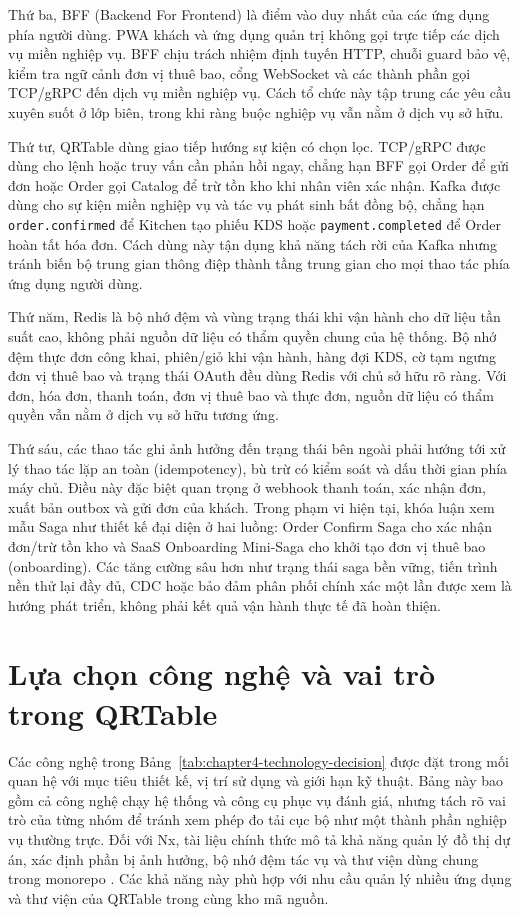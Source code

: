 Thứ ba, BFF (Backend For Frontend) là điểm vào duy nhất của các ứng dụng phía người dùng. PWA khách và ứng dụng quản trị không gọi trực tiếp các dịch vụ miền nghiệp vụ. BFF chịu trách nhiệm định tuyến HTTP, chuỗi guard bảo vệ, kiểm tra ngữ cảnh đơn vị thuê bao, cổng WebSocket và các thành phần gọi TCP/gRPC đến dịch vụ miền nghiệp vụ. Cách tổ chức này tập trung các yêu cầu xuyên suốt ở lớp biên, trong khi ràng buộc nghiệp vụ vẫn nằm ở dịch vụ sở hữu.

Thứ tư, QRTable dùng giao tiếp hướng sự kiện có chọn lọc. TCP/gRPC được dùng cho lệnh hoặc truy vấn cần phản hồi ngay, chẳng hạn BFF gọi Order để gửi đơn hoặc Order gọi Catalog để trừ tồn kho khi nhân viên xác nhận. Kafka được dùng cho sự kiện miền nghiệp vụ và tác vụ phát sinh bất đồng bộ, chẳng hạn \texttt{order.confirmed} để Kitchen tạo phiếu KDS hoặc \texttt{payment.completed} để Order hoàn tất hóa đơn. Cách dùng này tận dụng khả năng tách rời của Kafka \cite{apache-kafka-docs-2026} nhưng tránh biến bộ trung gian thông điệp thành tầng trung gian cho mọi thao tác phía ứng dụng người dùng.

Thứ năm, Redis là bộ nhớ đệm và vùng trạng thái khi vận hành cho dữ liệu tần suất cao, không phải nguồn dữ liệu có thẩm quyền chung của hệ thống. Bộ nhớ đệm thực đơn công khai, phiên/giỏ khi vận hành, hàng đợi KDS, cờ tạm ngưng đơn vị thuê bao và trạng thái OAuth đều dùng Redis với chủ sở hữu rõ ràng. Với đơn, hóa đơn, thanh toán, đơn vị thuê bao và thực đơn, nguồn dữ liệu có thẩm quyền vẫn nằm ở dịch vụ sở hữu tương ứng.

Thứ sáu, các thao tác ghi ảnh hưởng đến trạng thái bên ngoài phải hướng tới xử lý thao tác lặp an toàn (idempotency), bù trừ có kiểm soát và dấu thời gian phía máy chủ. Điều này đặc biệt quan trọng ở webhook thanh toán, xác nhận đơn, xuất bản outbox và gửi đơn của khách. Trong phạm vi hiện tại, khóa luận xem mẫu Saga như thiết kế đại diện ở hai luồng: Order Confirm Saga cho xác nhận đơn/trừ tồn kho và SaaS Onboarding Mini-Saga cho khởi tạo đơn vị thuê bao (onboarding). Các tăng cường sâu hơn như trạng thái saga bền vững, tiến trình nền thử lại đầy đủ, CDC hoặc bảo đảm phân phối chính xác một lần được xem là hướng phát triển, không phải kết quả vận hành thực tế đã hoàn thiện.

\section{Lựa chọn công nghệ và vai trò trong QRTable}

Các công nghệ trong Bảng~\ref{tab:chapter4-technology-decision} được đặt trong mối quan hệ với mục tiêu thiết kế, vị trí sử dụng và giới hạn kỹ thuật. Bảng này bao gồm cả công nghệ chạy hệ thống và công cụ phục vụ đánh giá, nhưng tách rõ vai trò của từng nhóm để tránh xem phép đo tải cục bộ như một thành phần nghiệp vụ thường trực. Đối với Nx, tài liệu chính thức mô tả khả năng quản lý đồ thị dự án, xác định phần bị ảnh hưởng, bộ nhớ đệm tác vụ và thư viện dùng chung trong monorepo \cite{nx-docs-2026}. Các khả năng này phù hợp với nhu cầu quản lý nhiều ứng dụng và thư viện của QRTable trong cùng kho mã nguồn.

